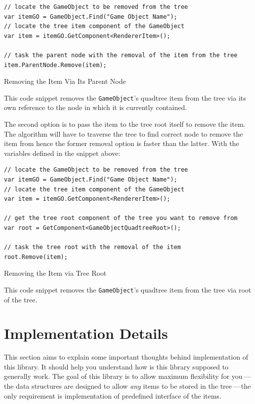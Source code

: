 \documentclass{article}
\begin{document}
\begin{listing}[H]
    \begin{verbatim}
// locate the GameObject to be removed from the tree
var itemGO = GameObject.Find("Game Object Name");
// locate the tree item component of the GameObject
var item = itemGO.GetComponent<RendererItem>();

// task the parent node with the removal of the item from the tree
item.ParentNode.Remove(item);
    \end{verbatim}
    \vspace{-1em}
    \caption{Removing the Item Via Its Parent Node} \label{code:remove:1}
    \smallskip\small\centering
    This code snippet removes the \texttt{GameObject}'s quadtree item from the tree via its own reference to the node in which it is currently contained.
\end{listing}

The second option is to pass the item to the tree root itself to remove the item.
The algorithm will have to traverse the tree to find correct node to remove the item from hence the former removal option is faster than the latter.
With the variables defined in the snippet above:

\begin{listing}[H]
    \begin{verbatim}
// locate the GameObject to be removed from the tree
var itemGO = GameObject.Find("Game Object Name");
// locate the tree item component of the GameObject
var item = itemGO.GetComponent<RendererItem>();

// get the tree root component of the tree you want to remove from
var root = GetComponent<GameObjectQuadtreeRoot>();

// task the tree root with the removal of the item
root.Remove(item);
    \end{verbatim}
    \vspace{-1em}
    \caption{Removing the Item via Tree Root} \label{code:remove:2}
    \smallskip\small\centering
    This code snippet removes the \texttt{GameObject}'s quadtree item from the tree via root of the tree.
\end{listing}


\section{Implementation Details} \label{details}
This section aims to explain some important thoughts behind implementation of this library.
It should help you understand how is this library supposed to generally work.
The goal of this library is to allow maximum flexibility for you\,---\,the data structures are designed to allow \textit{any} items to be stored in the tree\,---\,the only requirement is implementation of predefined interface of the items.
\end{document}
